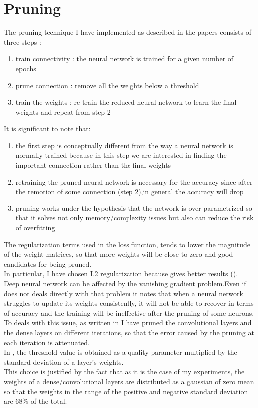 \documentclass[journal]{vgtc}                %
\begin{document}
\section{Pruning}
The pruning technique I have implemented as described in the papers consists of three steps :
\begin{enumerate}
\item train connectivity : the neural network is trained for a given number of epochs
\item prune connection : remove all the weights below a threshold
\item train the weights : re-train the reduced neural network to learn the final weights and repeat from step 2
\end{enumerate}
It is significant to note that:
\begin{enumerate}
\item the first step is conceptually different from the way a neural network is normally trained because in this step we are interested in finding the important connection rather than the final weights
\item retraining the pruned neural network is necessary for the accuracy since after the remotion of some connection (step 2),in general the accuracy will drop
\item pruning works under the hypothesis that the network is over-parametrized so that it solves not only memory/complexity issues but also can reduce the risk of overfitting
\end{enumerate}
The regularization terms used in the loss function, tends to lower the magnitude of the weight matrices, so that more weights will be close to zero and good candidates for being pruned.\\In particular, I have chosen L2 regularization because gives better results (\cite{p1}).\\Deep neural network can be affected by the vanishing gradient problem.Even if \cite{p1} does not deals directly with that problem it notes that when a neural network struggles to update its weights consistently, it will not be able to recover in terms of accuracy and the training will be ineffective after the pruning of some neurons. \\To deals with this issue, as written in  \cite{p1} I have pruned the convolutional layers and the dense layers on different iterations, so that the error caused by the pruning at each iteration is attenuated.\\In \cite{p1}, the threshold value is obtained as a quality parameter multiplied by the standard deviation of a layer's weights.\\This choice is justified by the fact that as it is the case of my experiments, the weights of a dense/convolutional layers are distributed as a gaussian of zero mean so that the weights in the range of the positive and negative standard deviation are 68\% of the total.\
\end{document}

